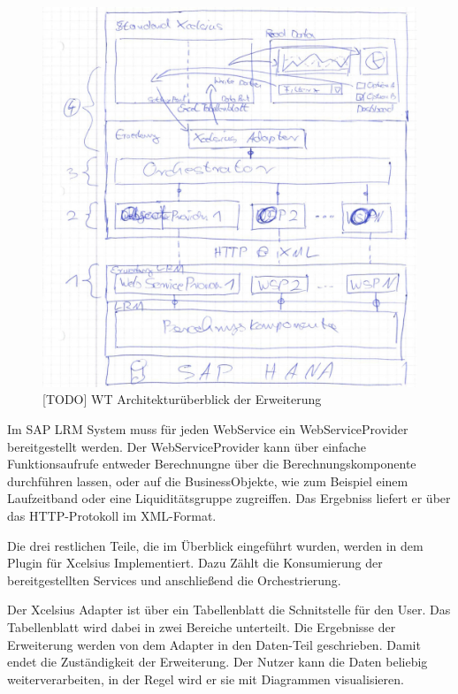 \begin{figure}[h]
\centering
\setlength{\unitlength}{1mm}
\includegraphics[width=15cm]{images/Ueberblick-Architektur.jpg}
\caption{[TODO] WT Architekturüberblick der Erweiterung\label{fig:ueberblick-architektur}}
\end{figure}

Im SAP LRM System muss für jeden WebService ein WebServiceProvider bereitgestellt werden. Der WebServiceProvider kann über einfache Funktionsaufrufe entweder Berechnungne über die Berechnungskomponente durchführen lassen, oder auf die BusinessObjekte, wie zum Beispiel einem Laufzeitband oder eine Liquiditätsgruppe zugreiffen. Das Ergebniss liefert er über das HTTP-Protokoll im XML-Format.

Die drei restlichen Teile, die im Überblick eingeführt wurden, werden in dem Plugin für Xcelsius Implementiert. Dazu Zählt die Konsumierung der bereitgestellten Services und anschließend die Orchestrierung.

Der Xcelsius Adapter ist über ein Tabellenblatt die Schnitstelle für den User. Das Tabellenblatt wird dabei in zwei Bereiche unterteilt. Die Ergebnisse der Erweiterung werden von dem Adapter in den Daten-Teil geschrieben. Damit endet die Zuständigkeit der Erweiterung. Der Nutzer kann die Daten beliebig weiterverarbeiten, in der Regel wird er sie mit Diagrammen visualisieren.


